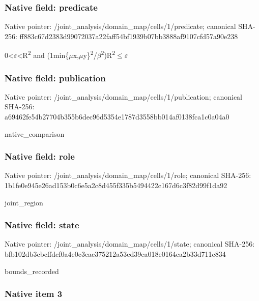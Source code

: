 \documentclass[10pt,a4paper]{article}
\begin{document}
\subsubsection{Native field: predicate}


Native pointer: /joint\_analysis/domain\_m\allowbreak{}ap/cells/1/predicate; canonical SHA-256: ff883c67d2383d99072037a2\allowbreak{}2faff54bf1939b07bb3888af\allowbreak{}9107cfd57a90e238


0<\ensuremath{\varepsilon}<R\textsuperscript{2} and (1min\{\ensuremath{\mu}x,\ensuremath{\mu}y\}\textsuperscript{2}/\ensuremath{\beta}\textsuperscript{2})R\textsuperscript{2}\ensuremath{\le}\ensuremath{\varepsilon}


\subsubsection{Native field: publication}


Native pointer: /joint\_analysis/domain\_m\allowbreak{}ap/cells/1/publication; canonical SHA-256: a69462fe54b27704b355b6de\allowbreak{}c96d5354e1787d3558bb014a\allowbreak{}f0138fca1c0a04a0


native\_comparison


\subsubsection{Native field: role}


Native pointer: /joint\_analysis/domain\_map/cells/1/role; canonical SHA-256: 1b1fe0e945e26ad153b0c6e5\allowbreak{}a2c8d455f335b5494422c167\allowbreak{}d6c3f82d99f1da92


joint\_region


\subsubsection{Native field: state}


Native pointer: /joint\_analysis/domain\_m\allowbreak{}ap/cells/1/state; canonical SHA-256: bfb102db3cbcffdcf0a4e0c3\allowbreak{}eac375212a53ed39ea018e01\allowbreak{}64ca2b33d711c834


bounds\_recorded


\subsubsection{Native item 3}
\end{document}
